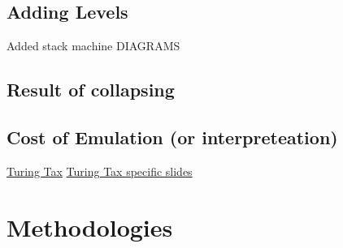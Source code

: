 \documentclass{article}
\begin{document}
\subsection{Adding Levels}
Added stack machine
DIAGRAMS

\subsection{Result of collapsing}

\subsection{Cost of Emulation (or interpreteation)}
\cite{steil2004dynamic}
\href{http://materials.dagstuhl.de/files/17/17061/17061.PaulH.J.Kelly.Slides.pdf}{Turing Tax}
\href{https://www.doc.ic.ac.uk/~phjk/AdvancedCompArchitecture/Lectures/pdfs/Ch01-TuringTaxDiscussionV02.pdf}{Turing Tax specific slides}

\section{Methodologies}




\end{document}
